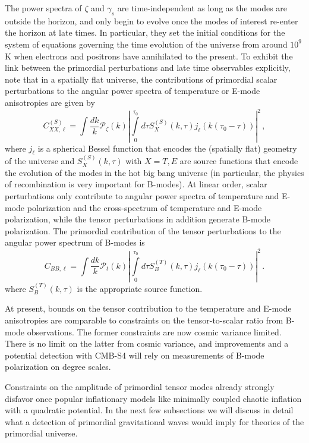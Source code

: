 The power spectra of $\zeta$ and $\gamma_s$ are time-independent as long as the modes are outside the horizon, and only begin to evolve once the modes of interest re-enter the horizon at late times. In particular, they set the initial conditions for the system of equations governing the time evolution of the universe from around $10^9$ K when electrons and positrons have annihilated to the present. To exhibit the link between the primordial perturbations and late time observables explicitly, note that in a spatially flat universe, the contributions of primordial scalar perturbations to the angular power spectra of temperature or E-mode anisotropies are given by
\begin{equation}
C^{(S)}_{XX,\ell}=\int \frac{dk}{k}\mathcal{P}_\zeta(k)\left|\int\limits_0^{\tau_0} d\tau S_X^{(S)}(k,\tau)j_\ell(k(\tau_0-\tau))\right|^2\,,
\end{equation}
where $j_\ell$ is a spherical Bessel function that encodes the (spatially flat) geometry of the universe and $S_X^{(S)}(k,\tau)$ with $X=T,E$ are source functions that encode the evolution of the modes in the hot big bang universe (in particular, the physics of recombination is very important for B-modes).
At linear order, scalar perturbations only contribute to angular power spectra of temperature and E-mode polarization and the cross-spectrum of temperature and E-mode polarization, while the tensor perturbations in addition generate B-mode polarization. The primordial contribution of the tensor perturbations to the angular power spectrum of B-modes is 
\begin{equation}
C_{BB,\ell}=\int \frac{dk}{k}\mathcal{P}_t(k)\left|\int\limits_0^{\tau_0} d\tau S_B^{(T)}(k,\tau)j_\ell(k(\tau_0-\tau))\right|^2\,.
\end{equation}
where $S_B^{(T)}(k,\tau)$ is the appropriate source function. 

At present, bounds on the tensor contribution to the temperature and E-mode anisotropies are comparable to constraints on the tensor-to-scalar ratio from B-mode observations. The former constraints are now cosmic variance limited. There is no limit on the latter from cosmic variance, and improvements and a potential detection with CMB-S4 will rely on measurements of B-mode polarization on degree scales.

Constraints on the amplitude of primordial tensor modes already strongly disfavor once popular inflationary models like minimally coupled chaotic inflation with a quadratic potential. In the next few subsections we will discuss in detail what a detection of primordial gravitational waves would imply for theories of the primordial universe. 

